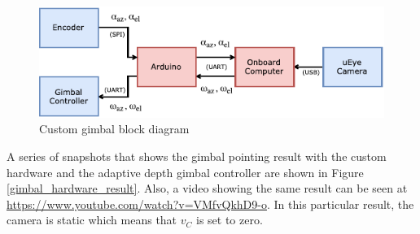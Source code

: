 \begin{figure}[htbp]
	\centering
	\includegraphics[width=0.8\linewidth]{images/chapter2/gimbal_system_blockdiagram}
	\caption{Custom gimbal block diagram}
	\label{gimbal_blockdiagram}
\end{figure}
A series of snapshots that shows the gimbal pointing result with the custom hardware and the adaptive depth gimbal controller are shown in Figure \ref{gimbal_hardware_result}. Also, a video showing the same result can be seen at \href{https://www.youtube.com/watch?v=VMfvQkhD9-o}{https://www.youtube.com/watch?v=VMfvQkhD9-o}. In this particular result, the camera is static which means that $v_{C}$ is set to zero.
